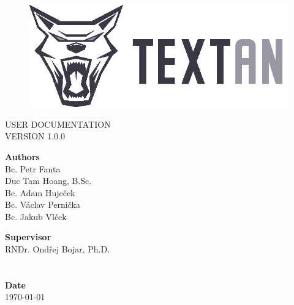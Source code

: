 \documentclass[12pt,a4paper]{report}
\begin{document}
\begin{titlepage}
\BgThispage
{}

\begin{figure}
 \includegraphics{../Logos/TEXTAN_logo_grey_B}
\end{figure}
\noindent
\textcolor{TextanRed}{\chapterfont\fontsize{48pt}{1pt}\selectfont\MakeUppercase{User documentation}}\\[15pt]
\textcolor{TextanDarkRed}{\sectionfont\LARGE\MakeUppercase{Version 1.0.0}}

\vfill
\noindent
\begin{minipage}[b]{.65\textwidth}
\textbf{Authors}\\
Bc. Petr Fanta\\
Duc Tam Hoang, B.Sc.\\
Bc. Adam Huječek\\
Bc. Václav Pernička\\
Bc. Jakub Vlček
\end{minipage}%
\begin{minipage}[b]{.35\textwidth}
\textbf{Supervisor} \\
RNDr. Ondřej Bojar, Ph.D.\\
\\
\\
\textbf{Date}\\
\today
\end{minipage}

\end{titlepage}
\restoregeometry

\tableofcontents


\end{document}
